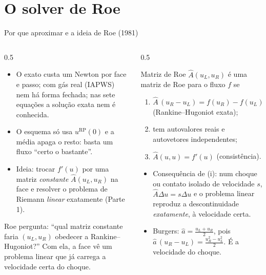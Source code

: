 \documentclass[aspectratio=169,10pt]{beamer}
\newcommand{\Ah}{\widehat A}
\newcommand{\RP}{u^{\mathrm{RP}}}
\begin{document}
\section{O solver de Roe}

\begin{frame}{Por que aproximar e a ideia de Roe (1981)}
\begin{columns}[T]
\begin{column}{0.5\textwidth}
\begin{itemize}
\item O exato custa um Newton por face e passo; com gás real (IAPWS) nem há forma fechada; nas sete equações a solução exata nem é conhecida.
\item O esquema só usa $\RP(0)$ e a média apaga o resto: basta um fluxo ``certo o bastante''.
\item Ideia: trocar $f'(u)$ por uma matriz \emph{constante} $\Ah(u_L,u_R)$ na face e resolver o problema de Riemann \emph{linear} exatamente (Parte 1).
\end{itemize}
\begin{intuicao}
Roe pergunta: ``qual matriz constante faria $(u_L,u_R)$ obedecer a Rankine--Hugoniot?'' Com ela, a face vê um problema linear que já carrega a velocidade certa do choque.
\end{intuicao}
\end{column}
\begin{column}{0.5\textwidth}
\begin{definicao}{Matriz de Roe}
$\Ah(u_L,u_R)$ é uma matriz de Roe para o fluxo $f$ se
\begin{enumerate}
\item[(i)] $\Ah\,(u_R-u_L)=f(u_R)-f(u_L)$ (Rankine--Hugoniot exata);
\item[(ii)] tem autovalores reais e autovetores independentes;
\item[(iii)] $\Ah(u,u)=f'(u)$ (consistência).
\end{enumerate}
\end{definicao}
\begin{itemize}
\item Consequência de (i): num choque ou contato isolado de velocidade $s$, $\Ah\Delta u=s\Delta u$ e o problema linear reproduz a descontinuidade \emph{exatamente}, à velocidade certa.
\item Burgers: $\hat a=\frac{u_L+u_R}{2}$, pois $\hat a\,(u_R-u_L)=\frac{u_R^2-u_L^2}{2}$. É a velocidade do choque.
\end{itemize}
\end{column}
\end{columns}
\end{frame}
\end{document}
